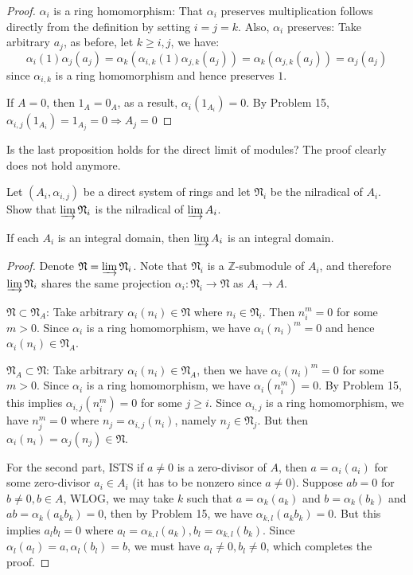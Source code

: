\documentclass{solution}
\begin{document}
\begin{proof}
    $\alpha_i$ is a ring homomorphism: That $\alpha_i$ preserves multiplication follows directly from the definition by setting $i = j = k$. Also, $\alpha_i$ preserves: Take arbitrary $a_j$, as before, let $k \ge i, j$, we have:
    $$\alpha_{i}(1) \alpha_j(a_j) = \alpha_k(\alpha_{i, k}(1) \alpha_{j, k}(a_j)) = \alpha_k(\alpha_{j, k}(a_j)) = \alpha_j(a_j)$$
    since $\alpha_{i, k}$ is a ring homomorphism and hence preserves $1$.

    If $A = 0$, then $1_A = 0_A$, as a result, $\alpha_{i}(1_{A_i}) = 0$. By Problem 15, $\alpha_{i, j}(1_{A_i}) = 1_{A_{j}} = 0 \Rightarrow A_j = 0$
\end{proof}

{\color{red} Is the last proposition holds for the direct limit of modules? The proof clearly does not hold anymore.}

\begin{problem}
    Let $(A_i, \alpha_{i, j})$ be a direct system of rings and let $\mathfrak{N}_i$ be the nilradical of $A_i$. Show that $\varinjlim \mathfrak{N}_{i}$ is the nilradical of $\varinjlim A_i$.

    If each $A_i$ is an integral domain, then $\varinjlim A_i$ is an integral domain.
\end{problem}

\begin{proof}
    Denote $\mathfrak{N} = \varinjlim \mathfrak{N}_i$. Note that $\mathfrak{N}_i$ is a $\mathbb{Z}$-submodule of $A_i$, and therefore $\varinjlim \mathfrak{N}_i$ shares the same projection $\alpha_i: \mathfrak{N}_i \rightarrow \mathfrak{N}$ as $A_i \rightarrow A$.

    $\mathfrak{N} \subset \mathfrak{N}_A$: Take arbitrary $\alpha_i(n_i) \in \mathfrak{N}$ where $n_i \in \mathfrak{N}_i$. Then $n_i^m = 0$ for some $m \gt 0$. Since $\alpha_i$ is a ring homomorphism, we have $\alpha_i(n_i)^m = 0$ and hence $\alpha_i(n_i) \in \mathfrak{N}_A$.

    $\mathfrak{N}_A \subset \mathfrak{N}$: Take arbitrary $\alpha_i(n_i) \in \mathfrak{N}_A$, then we have $\alpha_i(n_i)^m = 0$ for some $m \gt 0$. Since $\alpha_i$ is a ring homomorphism, we have $\alpha_i(n_i^m) = 0$. By Problem 15, this implies $\alpha_{i, j}(n_i^m) = 0$ for some $j \ge i$. Since $\alpha_{i, j}$ is a ring homomorphism, we have $n_j^m = 0$ where $n_j = \alpha_{i, j}(n_i)$, namely $n_j \in \mathfrak{N}_j$. But then $\alpha_i(n_i) = \alpha_j(n_j) \in \mathfrak{N}$.

    For the second part, ISTS if $a \ne 0$ is a zero-divisor of $A$, then $a = \alpha_i(a_i)$ for some zero-divisor $a_i \in A_i$ (it has to be nonzero since $a \ne 0$). Suppose $ab = 0$ for $b \ne 0, b \in A$, WLOG, we may take $k$ such that $a = \alpha_k(a_k)$ and $b = \alpha_k(b_k)$ and $ab = \alpha_k(a_kb_k) = 0$, then by Problem 15, we have $\alpha_{k, l}(a_kb_k) = 0$. But this implies $a_lb_l = 0$ where $a_l = \alpha_{k, l}(a_k), b_l = \alpha_{k, l}(b_k)$. Since $\alpha_l(a_l) = a, \alpha_l(b_l) = b$, we must have $a_l \ne 0, b_l \ne 0$, which completes the proof.
\end{proof}
\end{document}
